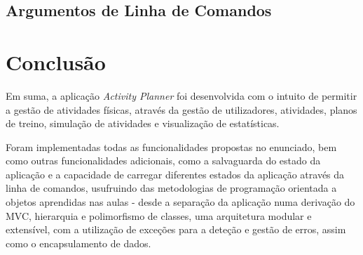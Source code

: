 \documentclass[a4paper,12pt]{scrreprt}
\begin{document}
\clearpage
\section{Argumentos de Linha de Comandos}



\chapter{Conclusão}
    Em suma, a aplicação \textit{Activity Planner} foi desenvolvida com o intuito de permitir a gestão de atividades físicas, através da gestão de utilizadores, atividades, planos de treino, simulação de atividades e visualização de estatísticas.

    Foram implementadas todas as funcionalidades propostas no enunciado, bem como outras funcionalidades adicionais, como a salvaguarda do estado da aplicação e a capacidade de carregar diferentes estados da aplicação através da linha de comandos, usufruindo das metodologias de programação orientada a objetos aprendidas nas aulas - desde a separação da aplicação numa derivação do MVC, hierarquia e polimorfismo de classes, uma arquitetura modular e extensível, com a utilização de exceções para a deteção e gestão de erros, assim como o encapsulamento de dados.

\end{document}
